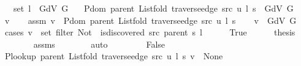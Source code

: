 \begin{isabellebody}
\ \ \ {\isachardoublequoteopen}set\ l\ {\isasymsubseteq}\ G{\isachardot}{\kern0pt}dV\ G{\isachardoublequoteclose}\isanewline
\ \ \ {\isachardoublequoteopen}P{\isachardot}{\kern0pt}dom\ {\isacharparenleft}{\kern0pt}parent\ {\isacharparenleft}{\kern0pt}List{\isachardot}{\kern0pt}fold\ {\isacharparenleft}{\kern0pt}traverse{\isacharunderscore}{\kern0pt}edge\ src\ u{\isacharparenright}{\kern0pt}\ l\ s{\isacharparenright}{\kern0pt}{\isacharparenright}{\kern0pt}\ {\isasymsubseteq}\ G{\isachardot}{\kern0pt}dV\ G{\isachardoublequoteclose}%
\endisataginvisible
{\isafoldinvisible}%
%
\isadeliminvisible
\isanewline
%
\endisadeliminvisible
%
\isadelimproof
%
\endisadelimproof
%
\isatagproof
{}\isamarkupfalse%
\isanewline
\ \ \isamarkupfalse%
\ v\isanewline
\ \ \isamarkupfalse%
\ assm{\isacharcolon}{\kern0pt}\ {\isachardoublequoteopen}v\ {\isasymin}\ P{\isachardot}{\kern0pt}dom\ {\isacharparenleft}{\kern0pt}parent\ {\isacharparenleft}{\kern0pt}List{\isachardot}{\kern0pt}fold\ {\isacharparenleft}{\kern0pt}traverse{\isacharunderscore}{\kern0pt}edge\ src\ u{\isacharparenright}{\kern0pt}\ l\ s{\isacharparenright}{\kern0pt}{\isacharparenright}{\kern0pt}{\isachardoublequoteclose}\isanewline
\ \ \isamarkupfalse%
\ {\isachardoublequoteopen}v\ {\isasymin}\ G{\isachardot}{\kern0pt}dV\ G{\isachardoublequoteclose}\isanewline
\ \ \isamarkupfalse%
\ {\isacharparenleft}{\kern0pt}cases\ {\isachardoublequoteopen}v\ {\isasymin}\ set\ {\isacharparenleft}{\kern0pt}filter\ {\isacharparenleft}{\kern0pt}Not\ {\isasymcirc}\ is{\isacharunderscore}{\kern0pt}discovered\ src\ {\isacharparenleft}{\kern0pt}parent\ s{\isacharparenright}{\kern0pt}{\isacharparenright}{\kern0pt}\ l{\isacharparenright}{\kern0pt}{\isachardoublequoteclose}{\isacharparenright}{\kern0pt}\isanewline
\ \ \ \ \isamarkupfalse%
\ True\isanewline
\ \ \ \ \isamarkupfalse%
\ {\isacharquery}{\kern0pt}thesis\isanewline
\ \ \ \ \ \ \isamarkupfalse%
\ assms{\isacharparenleft}{\kern0pt}{}{\isacharparenright}{\kern0pt}\isanewline
\ \ \ \ \ \ \isamarkupfalse%
\ auto\isanewline
\ \ \isamarkupfalse%
\isanewline
\ \ \ \ \isamarkupfalse%
\ False\isanewline
\ \ \ \ \isamarkupfalse%
\ {\isachardoublequoteopen}P{\isacharunderscore}{\kern0pt}lookup\ {\isacharparenleft}{\kern0pt}parent\ {\isacharparenleft}{\kern0pt}List{\isachardot}{\kern0pt}fold\ {\isacharparenleft}{\kern0pt}traverse{\isacharunderscore}{\kern0pt}edge\ src\ u{\isacharparenright}{\kern0pt}\ l\ s{\isacharparenright}{\kern0pt}{\isacharparenright}{\kern0pt}\ v\ {\isasymnoteq}\ None{\isachardoublequoteclose}\isanewline

\end{isabellebody}
